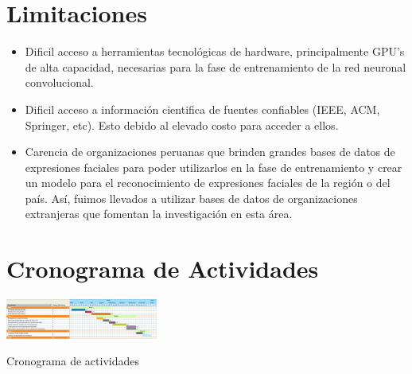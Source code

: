 \section{Limitaciones}
\begin{itemize}
\item Dificil acceso a herramientas tecnológicas de hardware, principalmente GPU's de alta capacidad, necesarias para la fase de entrenamiento de la red neuronal convolucional. 

\item Dificil acceso a información cientifica de fuentes confiables (IEEE, ACM, Springer, etc). Esto debido al elevado costo para acceder a ellos.


\item Carencia de organizaciones peruanas que brinden grandes bases de datos de expresiones faciales para poder utilizarlos en la fase de entrenamiento y crear un modelo para el reconocimiento de expresiones faciales de la región o del país. Así, fuimos llevados a utilizar bases de datos de organizaciones extranjeras que fomentan la investigación en esta área.


\end{itemize}
\newpage
\section{Cronograma de Actividades}
\begin{table}[!htb]
    \centering
    \includegraphics[angle=90,width=50mm]{Imagenes/cronograma.png}
    \caption{Cronograma de actividades}
    \label{tab:tab1}
\end{table}


